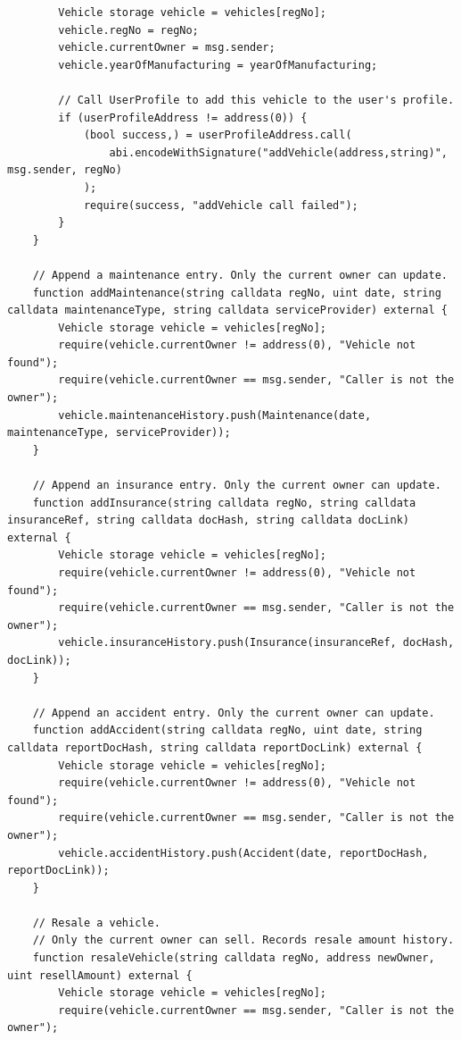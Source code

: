 \documentclass[12pt,a4paper]{article}
\begin{document}
\begin{verbatim}
        Vehicle storage vehicle = vehicles[regNo];
        vehicle.regNo = regNo;
        vehicle.currentOwner = msg.sender;
        vehicle.yearOfManufacturing = yearOfManufacturing;

        // Call UserProfile to add this vehicle to the user's profile.
        if (userProfileAddress != address(0)) {
            (bool success,) = userProfileAddress.call(
                abi.encodeWithSignature("addVehicle(address,string)", msg.sender, regNo)
            );
            require(success, "addVehicle call failed");
        }
    }

    // Append a maintenance entry. Only the current owner can update.
    function addMaintenance(string calldata regNo, uint date, string calldata maintenanceType, string calldata serviceProvider) external {
        Vehicle storage vehicle = vehicles[regNo];
        require(vehicle.currentOwner != address(0), "Vehicle not found");
        require(vehicle.currentOwner == msg.sender, "Caller is not the owner");
        vehicle.maintenanceHistory.push(Maintenance(date, maintenanceType, serviceProvider));
    }

    // Append an insurance entry. Only the current owner can update.
    function addInsurance(string calldata regNo, string calldata insuranceRef, string calldata docHash, string calldata docLink) external {
        Vehicle storage vehicle = vehicles[regNo];
        require(vehicle.currentOwner != address(0), "Vehicle not found");
        require(vehicle.currentOwner == msg.sender, "Caller is not the owner");
        vehicle.insuranceHistory.push(Insurance(insuranceRef, docHash, docLink));
    }

    // Append an accident entry. Only the current owner can update.
    function addAccident(string calldata regNo, uint date, string calldata reportDocHash, string calldata reportDocLink) external {
        Vehicle storage vehicle = vehicles[regNo];
        require(vehicle.currentOwner != address(0), "Vehicle not found");
        require(vehicle.currentOwner == msg.sender, "Caller is not the owner");
        vehicle.accidentHistory.push(Accident(date, reportDocHash, reportDocLink));
    }

    // Resale a vehicle.
    // Only the current owner can sell. Records resale amount history.
    function resaleVehicle(string calldata regNo, address newOwner, uint resellAmount) external {
        Vehicle storage vehicle = vehicles[regNo];
        require(vehicle.currentOwner == msg.sender, "Caller is not the owner");


\end{verbatim}
\end{document}
